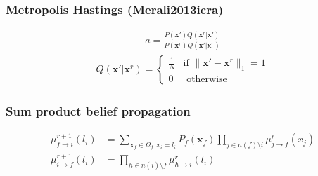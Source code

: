 \documentclass{beamer}
\newcommand{\vect}[1]{\mathbf{#1}}
\newcommand{\map}{\vect{x}}
\begin{document}
\begin{frame}
  \frametitle{Metropolis Hastings (Merali2013icra)}
  \begin{align}
    a = \frac{P(\map')Q(\map^r| \map')}
    {P(\map^r)Q(\map'| \map^r)}
  \end{align}
  \begin{align}
    Q(\map'| \map^r) = \begin{cases}
      \frac{1}{N} & \text{if $\|\map' - \map^r\|_1 = 1$}\\
                0 & \text{ otherwise}
    \end{cases}
    \label{eq:transitionprob}
  \end{align}
\end{frame}

\newcommand{\bpmsg}[4]{\mu^{#4}_{#1\rightarrow#2}(#3)}
\begin{frame}
  \frametitle{Sum product belief propagation}
  \begin{align}
    \bpmsg{f}{i}{l_i}{r+1} &= \sum_{\map_f \in \Omega_f: x_i = l_i}P_f(\map_f)\prod_{j \in n(f) \setminus i}\bpmsg{j}{f}{x_j}{r}
    \label{eq:factor2node}
    \\
    \bpmsg{i}{f}{l_i}{r+1} &= \prod_{h \in n(i) \setminus f}\bpmsg{h}{i}{l_i}{r}
    \label{eq:node2factor}
  \end{align}
\end{frame}
\end{document}
